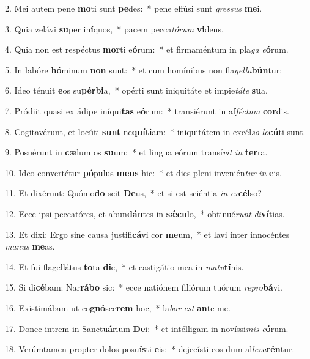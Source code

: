 2. Mei autem pene \textbf{mo}ti sunt \textbf{pe}des:~*  pene effúsi sunt \textit{gres}\textit{sus} \textbf{me}i.\

3. Quia zelávi \textbf{su}per in\textbf{í}quos,~*  pacem pecca\textit{tó}\textit{rum} \textbf{vi}dens.\

4. Quia non est respéctus \textbf{mor}ti e\textbf{ó}rum:~*  et firmaméntum in pla\textit{ga} \textit{e}\textbf{ó}rum.\

5. In labóre \textbf{hó}minum \textbf{non} sunt:~*  et cum homínibus non fla\textit{gel}\textit{la}\textbf{bún}tur:\

6. Ideo ténuit \textbf{e}os su\textbf{pér}\textbf{bi}a,~*  opérti sunt iniquitáte et impie\textit{tá}\textit{te} \textbf{su}a.\

7. Pródiit quasi ex ádipe iníqui\textbf{tas} e\textbf{ó}rum:~*  transiérunt in af\textit{féc}\textit{tum} \textbf{cor}dis.\

8. Cogitavérunt, et locúti \textbf{sunt} ne\textbf{quí}\textbf{ti}am:~*  iniquitátem in excél\textit{so} \textit{lo}\textbf{cú}ti sunt.\

9. Posuérunt in \textbf{cæ}lum os \textbf{su}um:~*  et lingua eórum transí\textit{vit} \textit{in} \textbf{ter}ra.\

10. Ideo convertétur \textbf{pó}pulus \textbf{me}\textbf{us} hic:~*  et dies pleni invenién\textit{tur} \textit{in} \textbf{e}is.\

11. Et dixérunt: Quómo\textbf{do} scit \textbf{De}us,~*  et si est sciéntia \textit{in} \textit{ex}\textbf{cél}so?\

12. Ecce ipsi peccatóres, et abun\textbf{dán}tes in \textbf{sǽ}\textbf{cu}lo,~*  obtinué\textit{runt} \textit{di}\textbf{ví}tias.\

13. Et dixi: Ergo sine causa justifi\textbf{cá}vi cor \textbf{me}um,~*  et lavi inter innocéntes \textit{ma}\textit{nus} \textbf{me}as.\

14. Et fui flagellátus \textbf{to}ta \textbf{di}e,~*  et castigátio mea in \textit{ma}\textit{tu}\textbf{tí}nis.\

15. Si di\textbf{cé}bam: Nar\textbf{rá}\textbf{bo} sic:~*  ecce natiónem filiórum tuórum \textit{re}\textit{pro}\textbf{bá}vi.\

16. Existimábam ut co\textbf{gnó}sce\textbf{rem} hoc,~*  la\textit{bor} \textit{est} \textbf{an}te me.\

17. Donec intrem in Sanctu\textbf{á}rium \textbf{De}i:~*  et intélligam in novíssi\textit{mis} \textit{e}\textbf{ó}rum.\

18. Verúmtamen propter dolos posu\textbf{ís}ti \textbf{e}is:~*  dejecísti eos dum al\textit{le}\textit{va}\textbf{rén}tur.\

